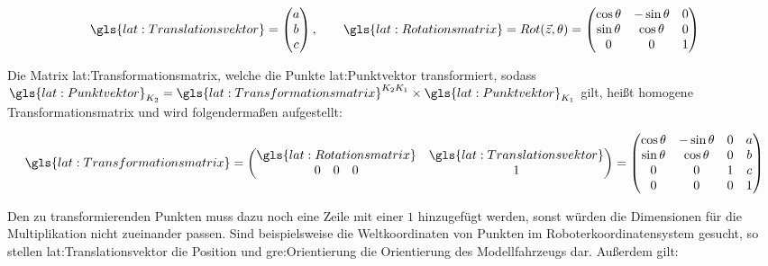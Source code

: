 \begin{equation}
\gls{lat:Translationsvektor} = 
\begin{pmatrix}
a 	\\
b 	\\
c    	\\
\end{pmatrix}
, \qquad
\gls{lat:Rotationsmatrix} = Rot(\vec{z},\theta) = 
\begin{pmatrix}
\cos{\theta} & -\sin{\theta} & {0} 	\\
\sin{\theta} & \cos{\theta} & {0} 	\\
{0} & {0} & {1} 				    	\\
\end{pmatrix}
\end{equation} 		

Die Matrix \gls{lat:Transformationsmatrix}, welche die Punkte \gls{lat:Punktvektor} transformiert, sodass 
\( \gls{lat:Punktvektor}_{K_2} = \gls{lat:Transformationsmatrix}^{K_2K_1} \times  \gls{lat:Punktvektor}_{K_1}	\) gilt, heißt homogene Transformationsmatrix und wird folgendermaßen aufgestellt:

\begin{equation}
\gls{lat:Transformationsmatrix} = 
\begin{pmatrix}
\gls{lat:Rotationsmatrix} &  \gls{lat:Translationsvektor}	\\
0 \quad 0 \quad 0 & 1 	\\
\end{pmatrix}
=
\begin{pmatrix}
\cos{\theta} & -\sin{\theta} & {0} & a 	\\
\sin{\theta} & \cos{\theta} & {0} & b 	\\
{0} & {0} & {1} & c 				    	\\
0 & 0 & 0 & 1 						\\
\end{pmatrix}
\end{equation}

Den zu transformierenden Punkten muss dazu noch eine Zeile mit einer \(1\) hinzugefügt werden, sonst würden die Dimensionen für die Multiplikation nicht zueinander passen. Sind beispielsweise die Weltkoordinaten von Punkten im Roboterkoordinatensystem gesucht, so stellen \gls{lat:Translationsvektor} die Position und \gls{gre:Orientierung} die Orientierung des Modellfahrzeugs dar. Außerdem gilt: 

